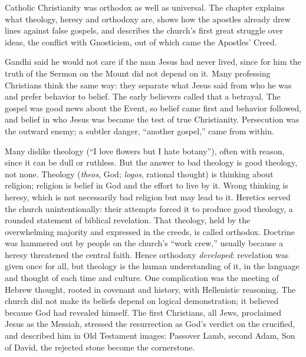 
\begin{inbrief}
Catholic Christianity was orthodox as well as universal. The chapter explains what theology, heresy
and orthodoxy are, shows how the apostles already drew lines against false gospels, and describes the
church's first great struggle over ideas, the conflict with Gnosticism, out of which came the
Apostles' Creed.
\end{inbrief}

Gandhi said he would not care if the man Jesus had never lived, since for him the truth of the Sermon on the Mount did not depend on it. Many professing Christians think the same way: they separate what Jesus said
from who he was and prefer behavior to belief. The early believers called that a betrayal. The gospel
was good news about the Event, so belief came first and behavior followed, and belief in who Jesus was
became the test of true Christianity. Persecution was the outward enemy; a subtler danger, ``another
gospel,'' came from within.

Many dislike theology (``I love flowers but I hate botany''), often with reason, since it can be dull
or ruthless. But the answer to bad theology is good theology, not none. Theology (\emph{theos}, God;
\emph{logos}, rational thought) is thinking about religion; religion is belief in God and the effort
to live by it. Wrong thinking is heresy, which is not necessarily bad religion but may lead to it.
Heretics served the church unintentionally: their attempts forced it to produce good theology, a
rounded statement of biblical revelation. That theology, held by the overwhelming majority and
expressed in the creeds, is called orthodox. Doctrine was hammered out by people on the church's
``work crew,'' usually because a heresy threatened the central faith. Hence orthodoxy
\emph{developed}: revelation was given once for all, but theology is the human understanding of it,
in the language and thought of each time and culture. One complication was the meeting of Hebrew
thought, rooted in covenant and history, with Hellenistic reasoning. The church did not make its
beliefs depend on logical demonstration; it believed because God had revealed himself. The first
Christians, all Jews, proclaimed Jesus as the Messiah, stressed the resurrection as God's verdict on
the crucified, and described him in Old Testament images: Passover Lamb, second Adam, Son of David,
the rejected stone become the cornerstone.

